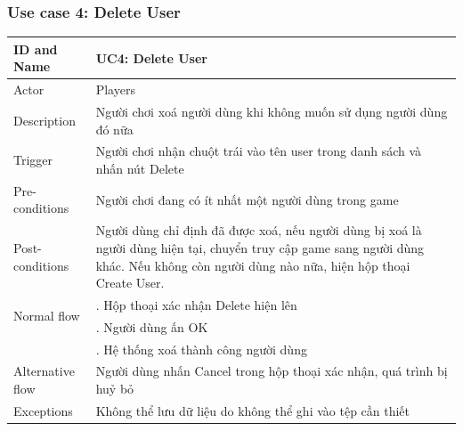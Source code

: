 \subsubsection{Use case 4: Delete User}
\begin{center}
	\begin{tabular}{|l|p{12cm}|}
		\hline
		ID and Name & UC4: Delete User \\
		\hline
		Actor  & Players \\
		\hline
		Description  & Người chơi xoá người dùng khi không muốn sử dụng người dùng đó nữa\\
		\hline
		Trigger  & Người chơi nhận chuột trái vào tên user trong danh sách và nhấn nút Delete\\
		\hline
		Pre-conditions & Người chơi đang có ít nhất một người dùng trong game \\
		\hline
		Post-conditions  & Người dùng chỉ định đã được xoá, nếu người dùng bị xoá là người dùng hiện tại, chuyển truy cập game sang người dùng khác. Nếu không còn người dùng nào nữa, hiện hộp thoại Create User.\\
		\hline
		\multirow{2}{*}{Normal flow}      &\qquad 1. Hộp thoại xác nhận Delete hiện lên\\
		&\qquad 2. Người dùng ấn OK\\
		&\qquad 3. Hệ thống xoá thành công người dùng\\
		\hline
		Alternative flow  & Người dùng nhấn Cancel trong hộp thoại xác nhận, quá trình bị huỷ bỏ\\
		\hline
		Exceptions  & Không thể lưu dữ liệu do không thể ghi vào tệp cần thiết\\
		\hline
	\end{tabular}
\end{center}
